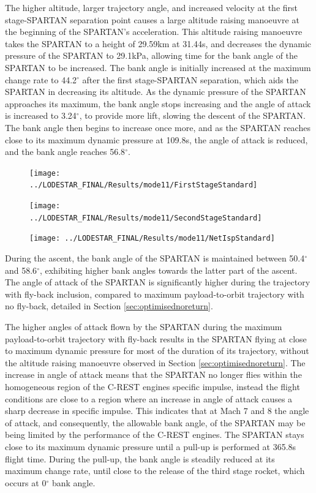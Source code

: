  The higher altitude, larger trajectory angle, and increased velocity at the first stage-SPARTAN separation point causes a large altitude raising manoeuvre at the beginning of the SPARTAN's acceleration. This altitude raising manoeuvre takes the SPARTAN to a height of 29.59km at 31.44s, and decreases the dynamic pressure of the SPARTAN to 29.1kPa, allowing time for the bank angle of the SPARTAN to be increased. 
 The bank angle is initially increased at the maximum change rate to 44.2$^\circ$ after the first stage-SPARTAN separation, which aids the SPARTAN in decreasing its altitude. As the dynamic pressure of the SPARTAN approaches its maximum, the bank angle stops increasing and the angle of attack is increased to 3.24$^\circ$, to provide more lift, slowing the descent of the SPARTAN. 
 The bank angle then begins to increase once more, and as the SPARTAN reaches close to its maximum dynamic pressure at 109.8s, the angle of attack is reduced, and the bank angle reaches 56.8$^\circ$. 

\begin{figure}[ht!]
\centering
\texttt{[image: ../LODESTAR\_FINAL/Results/mode11/FirstStageStandard]}
\caption{}
\label{fig:FirstStageStandard}
\end{figure}
 
\begin{figure}[ht!]
\centering
\texttt{[image: ../LODESTAR\_FINAL/Results/mode11/SecondStageStandard]}
\caption{}
\label{fig:SecondStageStandard}
\end{figure}
\begin{figure}[ht!]
\centering
\texttt{[image: ../LODESTAR\_FINAL/Results/mode11/NetIspStandard]}
\caption{}
\label{fig:NetIspStandard}
\end{figure}
During the ascent, the bank angle of the SPARTAN is maintained between 50.4$^\circ$ and 58.6$^\circ$, exhibiting higher bank angles towards the latter part of the ascent. 
The angle of attack of the SPARTAN is significantly higher during the trajectory with fly-back inclusion, compared to maximum payload-to-orbit trajectory with no fly-back, detailed in Section \ref{sec:optimisednoreturn}. 

 The higher angles of attack flown by the SPARTAN during the maximum payload-to-orbit trajectory with fly-back results in the SPARTAN flying at close to maximum dynamic pressure for most of the duration of its trajectory, without the altitude raising manoeuvre observed in Section \ref{sec:optimisednoreturn}.
 The increase in angle of attack means that the SPARTAN no longer flies within the homogeneous region of the C-REST engines specific impulse, instead the flight conditions are close to a region where an increase in angle of attack causes a sharp decrease in specific impulse. 
This indicates that at Mach 7 and 8 the angle of attack, and consequently, the allowable bank angle, of the SPARTAN may be being limited by the performance of the C-REST engines. 
 The SPARTAN stays close to its maximum dynamic pressure until a pull-up is performed at 365.8s flight time. During the pull-up, the bank angle is steadily reduced at its maximum change rate, until close to the release of the third stage rocket, which occurs at 0$^\circ$ bank angle. 

